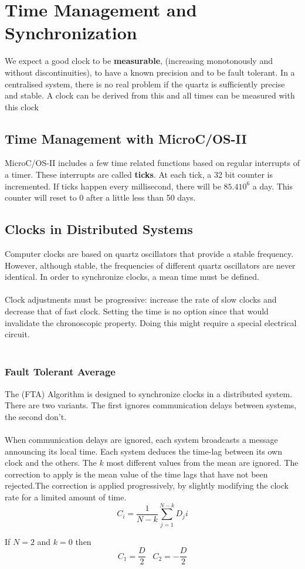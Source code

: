 \section{Time Management and Synchronization}
We expect a good clock to be \textbf{measurable},  (increasing monotonously and without discontinuities), to have a known precision and to be fault tolerant. In a centralised system, there is no real problem if the quartz is sufficiently precise and stable. A clock can be derived from this and all times can be measured with this clock

\subsection{ Time Management with MicroC/OS-II}
MicroC/OS-II includes a few time related functions based on regular interrupts of a timer. These interrupts are called \textbf{ticks}. At each tick, a 32 bit counter is incremented. If ticks happen every millisecond, there will be $85.4 10^6$ a day. This counter will reset to 0 after a little less than 50 days.

\subsection{Clocks in Distributed Systems}
Computer clocks are based on quartz oscillators that provide a stable frequency.
However, although stable, the frequencies of different quartz oscillators are never identical.
In order to  synchronize clocks, a mean time must be defined.
\\\\
Clock adjustments must be progressive: increase the rate of slow clocks and decrease that of fast clock. Setting the time is no option since that would invalidate the chronoscopic property. Doing this might require a special electrical circuit.
\\\\
\subsubsection{Fault Tolerant Average}
The  (FTA) Algorithm is designed to synchronize clocks in a distributed system. There are two variants. The first ignores communication delays between systems, the second don't.
\\\\
When communication delays are ignored, each system broadcasts a message announcing its local time. Each system deduces the time-lag between its own clock and the others. The $k$ most different values from the mean are ignored. The correction to apply is the mean value of the time lags that have not been rejected.The correction is applied progressively, by slightly modifying the clock rate for a limited amount of time.
\[
C_i = \frac{1}{N-k}\sum^{N-k}_{j=1}D_ji
\]
\begin{exmp}
If $N = 2$ and $k=0$ then
\[
C_1 = \frac{D}{2} \;\;\; C_2 = -\frac{D}{2}
\]
\end{exmp}

